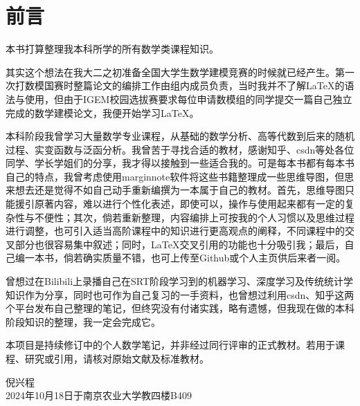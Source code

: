 
\chapter*{前言}
\hspace{2em}本书打算整理我本科所学的所有数学类课程知识。\par
其实这个想法在我大二之初准备全国大学生数学建模竞赛的时候就已经产生。第一次打数模国赛时整篇论文的编排工作由组内成员负责，当时我并不了解\LaTeX{}的语法与使用，但由于IGEM校园选拔赛要求每位申请数模组的同学提交一篇自己独立完成的数学建模论文，我便开始学习\LaTeX{}。\par
本科阶段我曾学习大量数学专业课程，从基础的数学分析、高等代数到后来的随机过程、实变函数与泛函分析。我曾苦于寻找合适的教材，感谢知乎、csdn等处各位同学、学长学姐们的分享，我才得以接触到一些适合我的。可是每本书都有每本书自己的特点，我曾考虑使用marginnote软件将这些书籍整理成一些思维导图，但思来想去还是觉得不如自己动手重新编撰为一本属于自己的教材。首先，思维导图只能援引原著内容，难以进行个性化表述，即使可以，操作与使用起来都有一定的复杂性与不便性；其次，倘若重新整理，内容编排上可按我的个人习惯以及思维过程进行调整，也可引入适当高阶课程中的知识进行更高观点的阐释，不同课程中的交叉部分也很容易集中叙述；同时，\LaTeX{}交叉引用的功能也十分吸引我；最后，自己编一本书，倘若确实质量不错，也可上传至Github或个人主页供后来者一阅。\par
曾想过在Bilibili上录播自己在SRT阶段学习到的机器学习、深度学习及传统统计学知识作为分享，同时也可作为自己复习的一手资料，也曾想过利用csdn、知乎这两个平台发布自己整理的笔记，但终究没有付诸实践，略有遗憾，但我现在做的本科阶段知识的整理，我一定会完成它。\par
本项目是持续修订中的个人数学笔记，并非经过同行评审的正式教材。若用于课程、研究或引用，请核对原始文献及标准教材。
\begin{flushright}
	倪兴程\\
	2024年10月18日于南京农业大学教四楼B409
\end{flushright}

